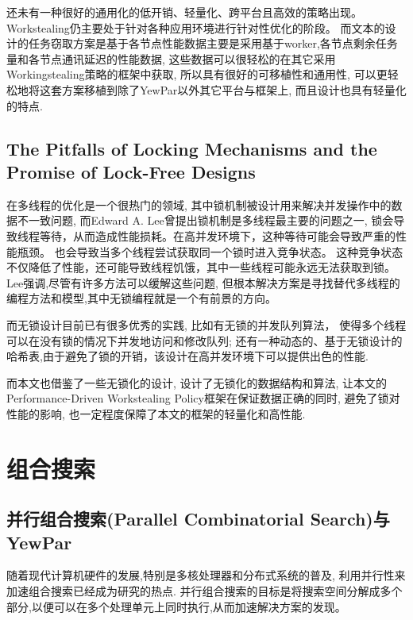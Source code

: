 \documentclass{mproj}
\begin{document}
还未有一种很好的通用化的低开销、轻量化、跨平台且高效的策略出现。
Workstealing仍主要处于针对各种应用环境进行针对性优化的阶段。
而文本的设计的任务窃取方案是基于各节点性能数据主要是采用基于worker,各节点剩余任务量和各节点通讯延迟的性能数据,
这些数据可以很轻松的在其它采用Workingstealing策略的框架中获取,
所以具有很好的可移植性和通用性,
可以更轻松地将这套方案移植到除了YewPar以外其它平台与框架上,
而且设计也具有轻量化的特点.

\subsection{The Pitfalls of Locking Mechanisms and the Promise of Lock-Free Designs}\label{survey_lock}
在多线程的优化是一个很热门的领域,
其中锁机制被设计用来解决并发操作中的数据不一致问题,
而Edward A. Lee曾提出锁机制是多线程最主要的问题之一\cite{1631937},
锁会导致线程等待，从而造成性能损耗。在高并发环境下，这种等待可能会导致严重的性能瓶颈。
也会导致当多个线程尝试获取同一个锁时进入竞争状态。
这种竞争状态不仅降低了性能，还可能导致线程饥饿，其中一些线程可能永远无法获取到锁。
Lee强调,尽管有许多方法可以缓解这些问题,
但根本解决方案是寻找替代多线程的编程方法和模型,其中无锁编程就是一个有前景的方向。

而无锁设计目前已有很多优秀的实践,
比如有无锁的并发队列算法，
使得多个线程可以在没有锁的情况下并发地访问和修改队列\cite{10.1145/248052.248106};
还有一种动态的、基于无锁设计的哈希表,由于避免了锁的开销，该设计在高并发环境下可以提供出色的性能\cite{10.1145/564870.564881}.

而本文也借鉴了一些无锁化的设计,
设计了无锁化的数据结构和算法,
让本文的Performance-Driven Workstealing Policy框架在保证数据正确的同时,
避免了锁对性能的影响,
也一定程度保障了本文的框架的轻量化和高性能.


\section{组合搜索}

\subsection{并行组合搜索(Parallel Combinatorial Search)与YewPar}
随着现代计算机硬件的发展,特别是多核处理器和分布式系统的普及,
利用并行性来加速组合搜索已经成为研究的热点.
并行组合搜索的目标是将搜索空间分解成多个部分,以便可以在多个处理单元上同时执行,从而加速解决方案的发现。
\end{document}
